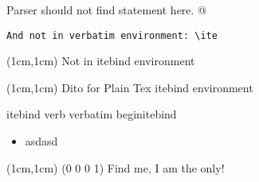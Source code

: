 \documentclass{article}
\begin{document}
\verb@ Parser should not find \ite statement here. @


\begin{verbatim}
And not in verbatim environment: \ite
\end{verbatim}

\begin{itebind}
\begin{iteblock}(1cm,1cm)
\ite Not in itebind environment
\end{iteblock}
\end{itebind}

\beginitebind
\begin{iteblock}(1cm,1cm)
\ite Dito for Plain Tex itebind environment
\end{iteblock}
\enditebind

itebind verb verbatim beginitebind

\begin{itemize}
\item asdasd
\end{itemize}

\begin{iteblock}(1cm,1cm)
\ITE(0 0 0 1) Find me, I am the only!
\end{iteblock}
\end{document}
